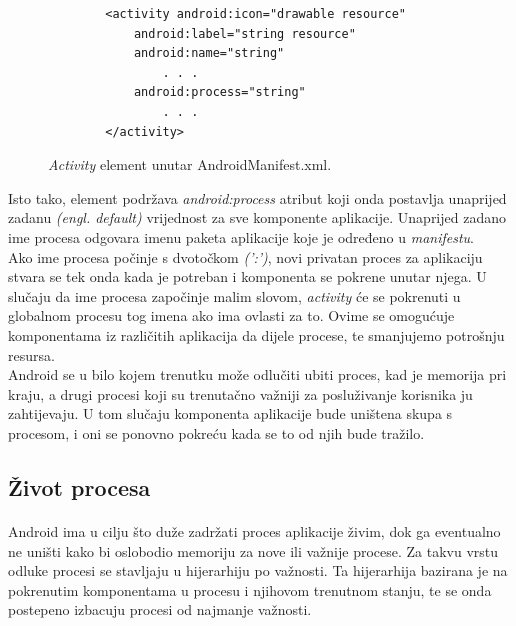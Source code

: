 \documentclass[times, utf8, zavrsni]{fer}
\begin{document}
\begin{figure}[ht!]
\centering
\begingroup
    \fontsize{10pt}{12pt}\selectfont
		\begin{lstlisting}
        <activity android:icon="drawable resource"
            android:label="string resource"
            android:name="string"
          	    . . .
            android:process="string"
          	    . . .
        </activity>
		\end{lstlisting}
\endgroup
\caption{\textit{Activity} element unutar AndroidManifest.xml.}
\label{overflow}
\end{figure}

Isto tako, \verb|| element podržava \textit{android:process} atribut koji onda postavlja unaprijed zadanu \textit{(engl. default)} vrijednost za sve komponente aplikacije. Unaprijed zadano ime procesa odgovara imenu paketa aplikacije koje je određeno u \textit{manifestu}.\\

Ako ime procesa počinje s dvotočkom \textit{(':')}, novi privatan proces za aplikaciju stvara se tek onda kada je potreban i komponenta se pokrene unutar njega. U slučaju da ime procesa započinje malim slovom, \textit{activity} će se pokrenuti u globalnom procesu tog imena ako ima ovlasti za to. Ovime se omogućuje komponentama iz različitih aplikacija da dijele procese, te smanjujemo potrošnju resursa.\\

Android se u bilo kojem trenutku može odlučiti ubiti proces, kad je memorija pri kraju, a drugi procesi koji su trenutačno važniji za posluživanje korisnika ju zahtijevaju. U tom slučaju komponenta aplikacije bude uništena skupa s procesom, i oni se ponovno pokreću kada se to od njih bude tražilo.


\subsection{Život procesa}
\paragraph{}
Android ima u cilju što duže zadržati proces aplikacije živim, dok ga eventualno ne uništi kako bi oslobodio memoriju za nove ili važnije procese. Za takvu vrstu odluke procesi se stavljaju u hijerarhiju po važnosti. Ta hijerarhija bazirana je na pokrenutim komponentama u procesu i njihovom trenutnom stanju, te se onda postepeno izbacuju procesi od najmanje važnosti.\\
\end{document}
